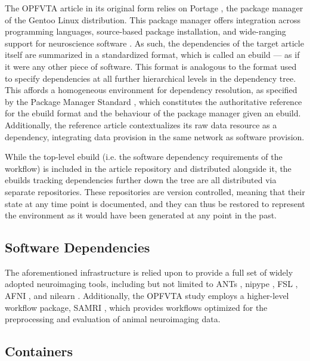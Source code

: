 The OPFVTA article in its original form relies on Portage \cite{portage}, the package manager of the Gentoo Linux distribution.
This package manager offers integration across programming languages, source-based package installation, and wide-ranging support for neuroscience software \cite{ng}.
As such, the dependencies of the target article itself are summarized in a standardized format, which is called an ebuild — as if it were any other piece of software.
This format is analogous to the format used to specify dependencies at all further hierarchical levels in the dependency tree.
This affords a homogeneous environment for dependency resolution, as specified by the Package Manager Standard \cite{pms}, which constitutes the authoritative reference for the ebuild format and the behaviour of the package manager given an ebuild.
Additionally, the reference article contextualizes its raw data resource as a dependency, integrating data provision in the same network as software provision.

While the top-level ebuild (i.e. the software dependency requirements of the workflow) is included in the article repository and distributed alongside it, the ebuilds tracking dependencies further down the tree are all distributed via separate repositories.
These repositories are version controlled, meaning that their state at any time point is documented, and they can thus be restored to represent the environment as it would have been generated at any point in the past.


\subsection{Software Dependencies}

The aforementioned infrastructure is relied upon to provide a full set of widely adopted neuroimaging tools, including but not limited to ANTs \cite{ants}, nipype \cite{nipype}, FSL \cite{fsl}, AFNI \cite{afni}, and nilearn \cite{nilearn}.
Additionally, the OPFVTA study employs a higher-level workflow package, SAMRI \cite{samri,irsabi}, which provides workflows optimized for the preprocessing and evaluation of animal neuroimaging data.


\subsection{Containers}

